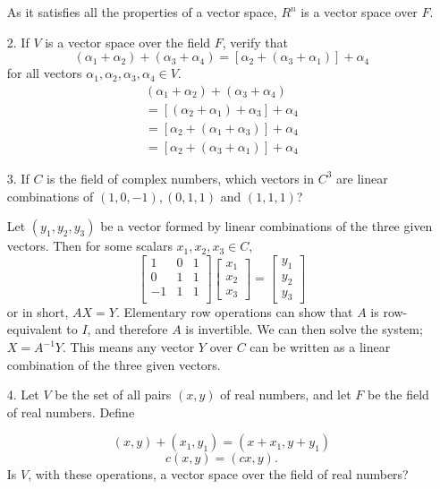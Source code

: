 \documentclass{article}
\begin{document}
\begin{enumerate}[listparindent=\parindent]
As it satisfies all the properties of a vector space, \(R^n\) is a vector space over \(F\).

\item[2.] If \(V\) is a vector space over the field \(F\), verify that
    \[(\alpha_1 + \alpha_2) + (\alpha_3 + \alpha_4) = [\alpha_2 + (\alpha_3 + \alpha_1)] + \alpha_4\]
    for all vectors \(\alpha_1, \alpha_2, \alpha_3, \alpha_4 \in V\).
    \begin{gather*}
        (\alpha_1 + \alpha_2) + (\alpha_3 + \alpha_4) \\
        = [(\alpha_2 + \alpha_1) + \alpha_3] + \alpha_4 \\
        = [\alpha_2 + (\alpha_1 + \alpha_3)] + \alpha_4 \\
        = [\alpha_2 + (\alpha_3 + \alpha_1)] + \alpha_4
    \end{gather*}

\item[3.] If \(C\) is the field of complex numbers, which vectors in \(C^3\) are linear combinations of
    \((1, 0, -1), (0, 1, 1)\) and \((1, 1, 1)\)?

Let \((y_1, y_2, y_3)\) be a vector formed by linear combinations of the three given vectors.
Then for some scalars \(x_1, x_2, x_3 \in C\),
\[
    \begin{bmatrix}
        1 & 0 & 1 \\
        0 & 1 & 1 \\
        -1 & 1 & 1 \\
    \end{bmatrix}
    \begin{bmatrix}
        x_1 \\ x_2 \\ x_3
    \end{bmatrix}
    =
    \begin{bmatrix}
        y_1 \\ y_2 \\ y_3
    \end{bmatrix}
\]
or in short, \(AX = Y\). Elementary row operations can show that \(A\) is row-equivalent to \(I\),
and therefore \(A\) is invertible. We can then solve the system; \(X = A^{-1}Y\).
This means any vector \(Y\) over \(C\) can be written as a linear combination of the three given vectors.

\item[4.] Let \(V\) be the set of all pairs \((x, y)\) of real numbers, and let \(F\) be the field of real numbers.
    Define

    \[(x, y) + (x_1, y_1) = (x + x_1, y + y_1)\]
    \[c(x, y) = (cx, y).\]
    Is \(V\), with these operations, a vector space over the field of real numbers?


\end{enumerate}
\end{document}
